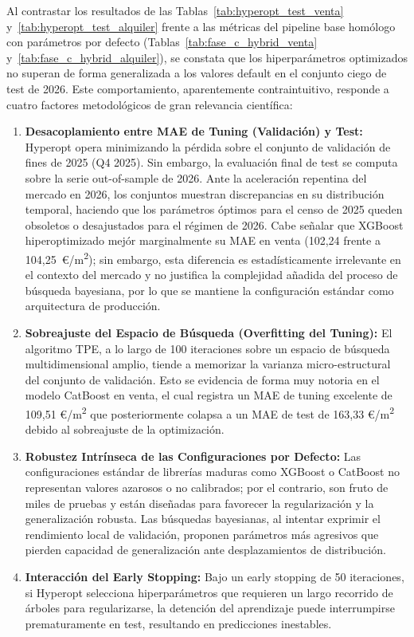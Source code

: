 \documentclass[a4paper,11pt,openany]{book}
\begin{document}
Al contrastar los resultados de las Tablas~\ref{tab:hyperopt_test_venta} y~\ref{tab:hyperopt_test_alquiler} frente a las métricas del pipeline base homólogo con parámetros por defecto (Tablas~\ref{tab:fase_c_hybrid_venta} y~\ref{tab:fase_c_hybrid_alquiler}), se constata que los hiperparámetros optimizados no superan de forma generalizada a los valores default en el conjunto ciego de test de 2026. Este comportamiento, aparentemente contraintuitivo, responde a cuatro factores metodológicos de gran relevancia científica:
\begin{enumerate}
    \item \textbf{Desacoplamiento entre MAE de Tuning (Validación) y Test:} Hyperopt opera minimizando la pérdida sobre el conjunto de validación de fines de 2025 (Q4 2025). Sin embargo, la evaluación final de test se computa sobre la serie out-of-sample de 2026. Ante la aceleración repentina del mercado en 2026, los conjuntos muestran discrepancias en su distribución temporal, haciendo que los parámetros óptimos para el censo de 2025 queden obsoletos o desajustados para el régimen de 2026. Cabe señalar que XGBoost hiperoptimizado mejór marginalmente su MAE en venta (102,24 frente a 104,25~€/m\textsuperscript{2}); sin embargo, esta diferencia es estadísticamente irrelevante en el contexto del mercado y no justifica la complejidad añadida del proceso de búsqueda bayesiana, por lo que se mantiene la configuración estándar como arquitectura de producción.
    \item \textbf{Sobreajuste del Espacio de Búsqueda (Overfitting del Tuning):} El algoritmo TPE, a lo largo de 100 iteraciones sobre un espacio de búsqueda multidimensional amplio, tiende a memorizar la varianza micro-estructural del conjunto de validación. Esto se evidencia de forma muy notoria en el modelo CatBoost en venta, el cual registra un MAE de tuning excelente de 109,51 €/m\textsuperscript{2} que posteriormente colapsa a un MAE de test de 163,33 €/m\textsuperscript{2} debido al sobreajuste de la optimización.
    \item \textbf{Robustez Intrínseca de las Configuraciones por Defecto:} Las configuraciones estándar de librerías maduras como XGBoost o CatBoost no representan valores azarosos o no calibrados; por el contrario, son fruto de miles de pruebas y están diseñadas para favorecer la regularización y la generalización robusta. Las búsquedas bayesianas, al intentar exprimir el rendimiento local de validación, proponen parámetros más agresivos que pierden capacidad de generalización ante desplazamientos de distribución.
    \item \textbf{Interacción del Early Stopping:} Bajo un early stopping de 50 iteraciones, si Hyperopt selecciona hiperparámetros que requieren un largo recorrido de árboles para regularizarse, la detención del aprendizaje puede interrumpirse prematuramente en test, resultando en predicciones inestables.
\end{enumerate}
\end{document}

